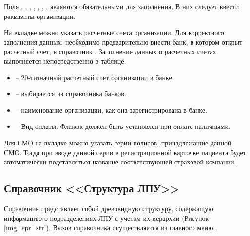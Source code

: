 Поля , , , , , , ,  являются обязательными для заполнения. В них следует ввести реквизиты организации.

На вкладке  можно указать расчетные счета организации. Для корректного заполнения данных, необходимо предварительно внести банк, в котором открыт расчетный счет, в справочник . Заполнение данных о расчетных счетах выполняется непосредственно в таблице.
\begin{itemize}
 \item {} – 20-тизначный расчетный счет организации в банке.
 \item {} – выбирается из справочника банков.
 \item {} – наименование организации, как она зарегистрирована в банке.
 \item {} – Вид оплаты. Флажок должен быть установлен при оплате наличными.
\end{itemize}

Для СМО на вкладке  можно указать серии полисов, принадлежащие данной СМО. Тогда при вводе данной серии в регистрационной карточке пациента будет автоматически подставляться название соответствующей страховой компании.

\subsection{Справочник <<Структура ЛПУ>>}

Справочник  представляет собой древовидную структуру, содержащую информацию о подразделениях ЛПУ с учетом их иерархии (Рисунок \ref{img_spr_str}). Вызов справочника осуществляется из главного меню .

